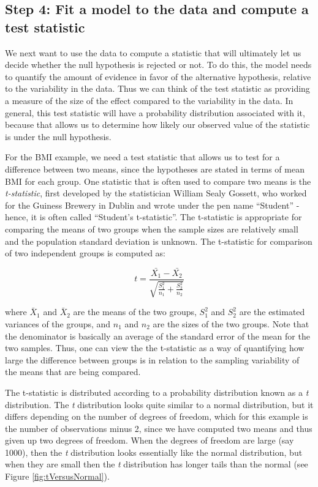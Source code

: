 \documentclass[12pt,]{book}
\theoremstyle{definition}
\theoremstyle{definition}
\theoremstyle{definition}
\theoremstyle{remark}
\begin{document}
\hypertarget{step-4-fit-a-model-to-the-data-and-compute-a-test-statistic}{%
\subsection{Step 4: Fit a model to the data and compute a test statistic}\label{step-4-fit-a-model-to-the-data-and-compute-a-test-statistic}}

We next want to use the data to compute a statistic that will ultimately let us decide whether the null hypothesis is rejected or not. To do this, the model needs to quantify the amount of evidence in favor of the alternative hypothesis, relative to the variability in the data. Thus we can think of the test statistic as providing a measure of the size of the effect compared to the variability in the data. In general, this test statistic will have a probability distribution associated with it, because that allows us to determine how likely our observed value of the statistic is under the null hypothesis.

For the BMI example, we need a test statistic that allows us to test for a difference between two means, since the hypotheses are stated in terms of mean BMI for each group. One statistic that is often used to compare two means is the \emph{t-statistic}, first developed by the statistician William Sealy Gossett, who worked for the Guiness Brewery in Dublin and wrote under the pen name ``Student'' - hence, it is often called ``Student's t-statistic''. The t-statistic is appropriate for comparing the means of two groups when the sample sizes are relatively small and the population standard deviation is unknown. The t-statistic for comparison of two independent groups is computed as:

\[
t = \frac{\bar{X_1} - \bar{X_2}}{\sqrt{\frac{S_1^2}{n_1} + \frac{S_2^2}{n_2}}}
\]

where \(\bar{X}_1\) and \(\bar{X}_2\) are the means of the two groups, \(S^2_1\) and \(S^2_2\) are the estimated variances of the groups, and \(n_1\) and \(n_2\) are the sizes of the two groups. Note that the denominator is basically an average of the standard error of the mean for the two samples. Thus, one can view the the t-statistic as a way of quantifying how large the difference between groups is in relation to the sampling variability of the means that are being compared.

The t-statistic is distributed according to a probability distribution known as a \emph{t} distribution. The \emph{t} distribution looks quite similar to a normal distribution, but it differs depending on the number of degrees of freedom, which for this example is the number of observations minus 2, since we have computed two means and thus given up two degrees of freedom. When the degrees of freedom are large (say 1000), then the \emph{t} distribution looks essentially like the normal distribution, but when they are small then the \emph{t} distribution has longer tails than the normal (see Figure \ref{fig:tVersusNormal}).
\end{document}
